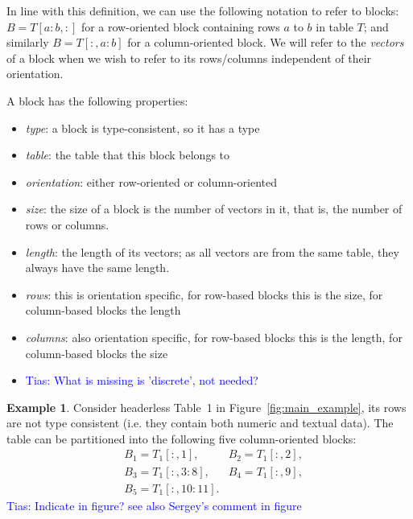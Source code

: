 \documentclass{IEEEtran}
\newcommand{\tias}[1]{\textcolor{blue}{{\sc Tias:} #1}\xspace}
\newcommand{\range}[3]{\ensuremath{#1[#2,#3]}}
\newcommand{\rangeto}[2]{#1{:}#2}
\newcommand{\rangeall}{:}
\theoremstyle{definition}
\newtheorem{example}{Example}
\begin{document}
In line with this definition, we can use the following notation to refer to blocks: $B = T[\rangeto{a}{b},:]$ for a row-oriented block containing rows $a$ to $b$ in table $T$; and similarly $B = T[{:},\rangeto{a}{b}]$ for a column-oriented block.
We will refer to the \textit{vectors} of a block when we wish to refer to its rows/columns independent of their orientation.


A block has the following properties:
\begin{itemize}
\item \textit{type}: a block is type-consistent, so it has a type
\item \textit{table}: the table that this block belongs to
\item \textit{orientation}: either row-oriented or column-oriented
\item \textit{size}: the size of a block is the number of vectors in it, that is, the number of rows or columns.
\item \textit{length}: the length of its vectors; as all vectors are from the same table, they always have the same length.
\item \textit{rows}: this is orientation specific, for row-based blocks this is the size, for column-based blocks the length
\item \textit{columns}: also orientation specific, for row-based blocks this is the length, for column-based blocks the size
\item \tias{What is missing is 'discrete', not needed?}
\end{itemize}



\begin{example}
Consider headerless Table~1 in Figure~\ref{fig:main_example}, its rows are not type consistent (i.e. they contain both numeric and textual data). The table can be partitioned into the following five column-oriented blocks:
{\small
\begin{align*}
&B_1 = \range{T_1}{\rangeall}{1},
&B_2 = \range{T_1}{\rangeall}{2},\\
&B_3 = \range{T_1}{\rangeall}{\rangeto{3}{8}},
&B_4 = \range{T_1}{\rangeall}{9},\\
&B_5 = \range{T_1}{\rangeall}{\rangeto{10}{11}}.
\end{align*}
\tias{Indicate in figure? see also Sergey's comment in figure}
}
\end{example}
\end{document}
